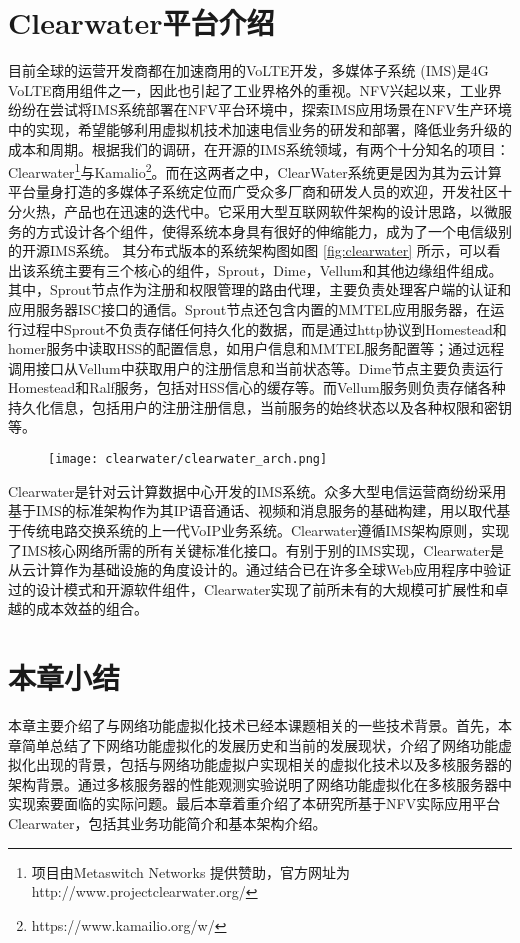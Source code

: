 \section{Clearwater平台介绍}
\label{intro:clearwater}
目前全球的运营开发商都在加速商用的VoLTE开发，多媒体子系统 (IMS)是4G VoLTE商用组件之一，因此也引起了工业界格外的重视。NFV兴起以来，工业界纷纷在尝试将IMS系统部署在NFV平台环境中，探索IMS应用场景在NFV生产环境中的实现，希望能够利用虚拟机技术加速电信业务的研发和部署，降低业务升级的成本和周期。根据我们的调研，在开源的IMS系统领域，有两个十分知名的项目：Clearwater\footnote{项目由Metaswitch Networks 提供赞助，官方网址为 http://www.projectclearwater.org/ }与Kamalio\footnote{https://www.kamailio.org/w/}。而在这两者之中，ClearWater系统更是因为其为云计算平台量身打造的多媒体子系统定位而广受众多厂商和研发人员的欢迎，开发社区十分火热，产品也在迅速的迭代中。它采用大型互联网软件架构的设计思路，以微服务的方式设计各个组件，使得系统本身具有很好的伸缩能力，成为了一个电信级别的开源IMS系统。
其分布式版本的系统架构图如图 \ref{fig:clearwater} 所示，可以看出该系统主要有三个核心的组件，Sprout，Dime，Vellum和其他边缘组件组成。其中，Sprout节点作为注册和权限管理的路由代理，主要负责处理客户端的认证和应用服务器ISC接口的通信。Sprout节点还包含内置的MMTEL应用服务器，在运行过程中Sprout不负责存储任何持久化的数据，而是通过http协议到Homestead和homer服务中读取HSS的配置信息，如用户信息和MMTEL服务配置等；通过远程调用接口从Vellum中获取用户的注册信息和当前状态等。Dime节点主要负责运行Homestead和Ralf服务，包括对HSS信心的缓存等。而Vellum服务则负责存储各种持久化信息，包括用户的注册注册信息，当前服务的始终状态以及各种权限和密钥等。
\begin{figure}[!htp]
	\centering
	\texttt{[image: clearwater/clearwater\_arch.png]}
\end{figure}
Clearwater是针对云计算数据中心开发的IMS系统。众多大型电信运营商纷纷采用基于IMS的标准架构作为其IP语音通话、视频和消息服务的基础构建，用以取代基于传统电路交换系统的上一代VoIP业务系统。Clearwater遵循IMS架构原则，实现了IMS核心网络所需的所有关键标准化接口。有别于别的IMS实现，Clearwater是从云计算作为基础设施的角度设计的。通过结合已在许多全球Web应用程序中验证过的设计模式和开源软件组件，Clearwater实现了前所未有的大规模可扩展性和卓越的成本效益的组合。

\section{本章小结}
本章主要介绍了与网络功能虚拟化技术已经本课题相关的一些技术背景。首先，本章简单总结了下网络功能虚拟化的发展历史和当前的发展现状，介绍了网络功能虚拟化出现的背景，包括与网络功能虚拟户实现相关的虚拟化技术以及多核服务器的架构背景。通过多核服务器的性能观测实验说明了网络功能虚拟化在多核服务器中实现索要面临的实际问题。最后本章着重介绍了本研究所基于NFV实际应用平台Clearwater，包括其业务功能简介和基本架构介绍。